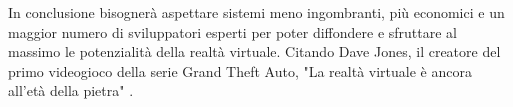 In conclusione bisognerà aspettare sistemi meno ingombranti, più economici e un maggior numero di sviluppatori esperti per poter diffondere e sfruttare al massimo le potenzialità della realtà virtuale. Citando Dave Jones, il creatore del primo videogioco della serie Grand Theft Auto, "La realtà virtuale è ancora all'età della pietra" \cite{VRStone}. 

